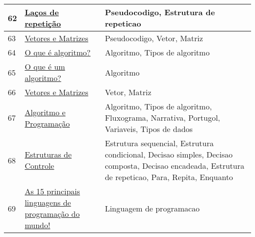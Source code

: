\begin{longtable}{| p{} | p{} | p{} |}
62  & \href{http://www.rafaeltoledo.net/lacos-de-repeticao/}{Laços de repetição                                                                  } & Pseudocodigo, Estrutura de repeticao                                                                                                              \\ \hline
63  & \href{http://www.rafaeltoledo.net/vetores-e-matrizes/}{Vetores e Matrizes                                                                  } & Pseudocodigo, Vetor, Matriz                                                                                                                       \\ \hline
64  & \href{http://www.tecmundo.com.br/programacao/2082-o-que-e-algoritmo-.htm}{O que é algoritmo?                                                                  } & Algoritmo, Tipos de algoritmo                                                                                                                     \\ \hline
65  & \href{http://www.tiexpert.net/programacao/algoritmo/o-que-e-um-algoritmo.php}{O que é um algoritmo?                                                               } & Algoritmo                                                                                                                                         \\ \hline
66  & \href{http://www.univasf.edu.br/~andreza.leite/aulas/AP/VetoresMatrizes.pdf}{Vetores e Matrizes                                                                  } & Vetor, Matriz                                                                                                                                     \\ \hline
67  & \href{http://www.univasf.edu.br/~jose.valentim/aula1.pdf}{Algoritmo e Programação                                                             } & Algoritmo, Tipos de algoritmo, Fluxograma, Narrativa, Portugol, Variaveis, Tipos de dados                                                         \\ \hline
68  & \href{http://www.univasf.edu.br/~ricardo.aramos/disciplinas/AlgProgAgr\_2011\_1/cap03AnaEmilia.pdf}{Estruturas de Controle                                                              } & Estrutura sequencial, Estrutura condicional, Decisao simples, Decisao composta, Decisao encadeada, Estrutura de repeticao, Para, Repita, Enquanto \\ \hline
69  & \href{https://becode.com.br/principais-linguagens-de-programacao/}{As 15 principais linguagens de programação do mundo!                                } & Linguagem de programacao                                                                                                                          \\ \hline

\end{longtable}
